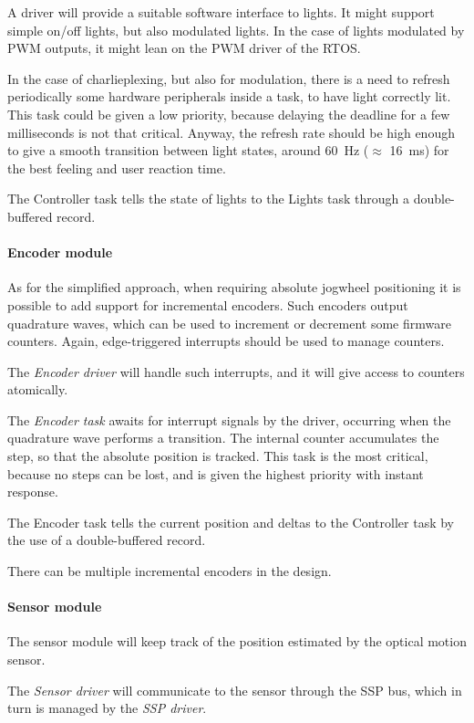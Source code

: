 \documentclass[a4paper,10pt]{article}
\begin{document}
\begin{multicols}{2}
A driver will provide a suitable software interface to lights. It might
support simple on/off lights, but also modulated lights. In the case of lights
modulated by PWM outputs, it might lean on the PWM driver of the RTOS.

In the case of charlieplexing, but also for modulation, there is a need to
refresh periodically some hardware peripherals inside a task, to have light
correctly lit. This task could be given a low priority, because delaying the
deadline for a few milliseconds is not that critical. Anyway, the refresh rate
should be high enough to give a smooth transition between light states, around
60~Hz ($\approx$ 16~ms) for the best feeling and user reaction time.

The Controller task tells the state of lights to the Lights task through a
double-buffered record.


\paragraph{Encoder module}
As for the simplified approach, when requiring absolute jogwheel positioning
it is possible to add support for incremental encoders. Such encoders output
quadrature waves, which can be used to increment or decrement some firmware
counters. Again, edge-triggered interrupts should be used to manage counters.

The \emph{Encoder driver} will handle such interrupts, and it will give access
to counters atomically.

The \emph{Encoder task} awaits for interrupt signals by the driver, occurring
when the quadrature wave performs a transition. The internal counter
accumulates the step, so that the absolute position is tracked. This task is
the most critical, because no steps can be lost, and is given the highest
priority with instant response.

The Encoder task tells the current position and deltas to the Controller task
by the use of a double-buffered record.

There can be multiple incremental encoders in the design.


\paragraph{Sensor module}
The sensor module will keep track of the position estimated by the optical
motion sensor.

The \emph{Sensor driver} will communicate to the sensor through the SSP bus,
which in turn is managed by the \emph{SSP driver}.


\end{multicols}
\end{document}
